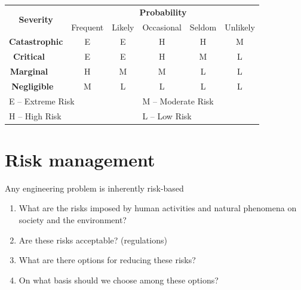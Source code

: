 \documentclass[aspectratio=1610,pdftex,dvipsnames,compress,xcolor={dvipsnames}]{beamer}
\begin{document}
\begin{frame}{}
    \begin{longtable}{|c|c|c|c|c|c|}
        \hline
        \multirow{2}{*}{\textbf{Severity}} 
        & \multicolumn{5}{c|}{\textbf{Probability}} 
        \\ 
        \cline{2-6}
         
        & Frequent 
        & Likely 
        & Occasional 
        & Seldom 
        & Unlikely 
        \\ 
        \hline
        \textbf{Catastrophic} 
        & E 
        & E 
        & H 
        & H 
        & M 
        \\ 
        \hline
        \textbf{Critical}     
        & E 
        & E 
        & H 
        & M 
        & L 
        \\ 
        \hline
        \textbf{Marginal}     
        & H 
        & M 
        & M 
        & L 
        & L 
        \\ 
        \hline
        \textbf{Negligible}   
        & M 
        & L 
        & L 
        & L 
        & L 
        \\ 
        \hline
        \hline
        \multicolumn{3}{|l}{E -- Extreme Risk} 
        & \multicolumn{3}{l|}{M -- Moderate Risk} 
        \\
        \multicolumn{3}{|l}{H -- High Risk}    
        & \multicolumn{3}{l|}{L -- Low Risk} 
        \\ 
        \hline
    \end{longtable}
\end{frame}


\section{Risk management}


\addtocounter{framenumber}{-1}
\begin{frame}{Any engineering problem is inherently risk-based}
    \begin{enumerate}[series=outerlist,topsep=0pt,itemsep=21pt,leftmargin=*,label=(\arabic*)]
        \item What are the risks imposed by human activities and natural phenomena on society and the environment?
        \item Are these risks acceptable? (regulations)
        \item What are there options for reducing these risks?
        \item On what basis should we choose among these options?
    \end{enumerate}
\end{frame}
\end{document}
